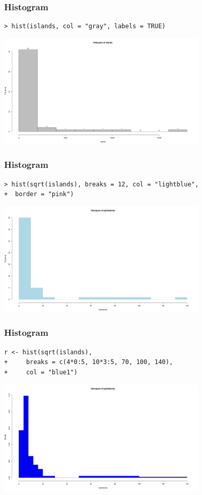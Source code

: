 \documentclass[xcolor={table},c]{beamer}
\begin{document}
\begin{frame}[fragile]\frametitle{Histogram}
\begin{center}
\begin{verbatim}
> hist(islands, col = "gray", labels = TRUE)
\end{verbatim}
  \includegraphics[width=10cm]{hist2.png}
\end{center}
\end{frame}


\begin{frame}[fragile]\frametitle{Histogram}
\begin{center}
\begin{verbatim}
> hist(sqrt(islands), breaks = 12, col = "lightblue", 
+  border = "pink")
\end{verbatim}
  \includegraphics[width=10cm]{hist3.png}
\end{center}
\end{frame}


\begin{frame}[fragile]\frametitle{Histogram}
\begin{center}
\begin{verbatim}
r <- hist(sqrt(islands), 
+     breaks = c(4*0:5, 10*3:5, 70, 100, 140),
+     col = "blue1")
\end{verbatim}
  \includegraphics[width=10cm]{hist4.png}
\end{center}
\end{frame}
\end{document}
